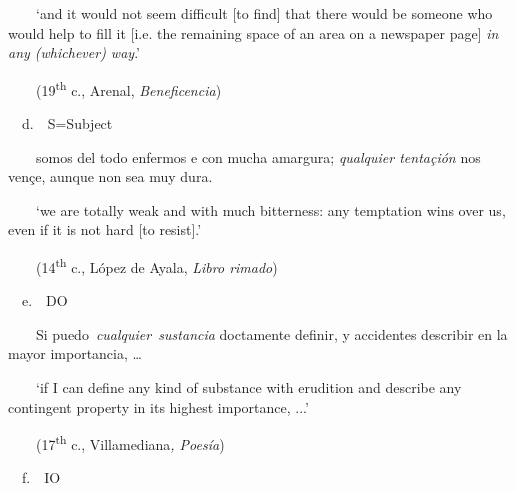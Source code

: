 \begin{styleStandard}
\ \ \ \ ‘and it would not seem difficult [to find] that there would be someone who would help to fill it [i.e. the remaining space of an area on a newspaper page] \textit{in any (whichever) way}.’
\end{styleStandard}

\begin{styleStandard}
\ \ \ \ (19\textsuperscript{th} c.,\textit{ }Arenal,\textit{ Beneficencia})
\end{styleStandard}

\begin{styleStandard}
\ \ d.\ \ S=Subject
\end{styleStandard}

\begin{styleStandard}
\ \ \ \ somos del todo enfermos e con mucha amargura; \textit{qualquier tentaçión} nos vençe, aunque non sea muy dura. 
\end{styleStandard}

\begin{styleStandard}
\ \ \ \ ‘we are totally weak and with much bitterness: any temptation wins over us, even if it is not hard [to resist].’
\end{styleStandard}

\begin{styleStandard}
\ \ \ \ (14\textsuperscript{th} c., López de Ayala,\textit{ Libro rimado})
\end{styleStandard}

\begin{styleStandard}
\ \ e.\ \ DO
\end{styleStandard}

\begin{styleStandard}
\ \ \ \ Si puedo~\textit{cualquier~sustancia} doctamente definir, y accidentes describir en la mayor importancia, … 
\end{styleStandard}

\begin{styleStandard}
\ \ \ \ ‘if I can define any kind of substance with erudition and describe any contingent property in its highest importance, ...’
\end{styleStandard}

\begin{styleStandard}
\ \ \ \ (17\textsuperscript{th} c., Villamediana\textit{, Poesía})
\end{styleStandard}

\begin{styleStandard}
\ \ f.\ \ IO
\end{styleStandard}

